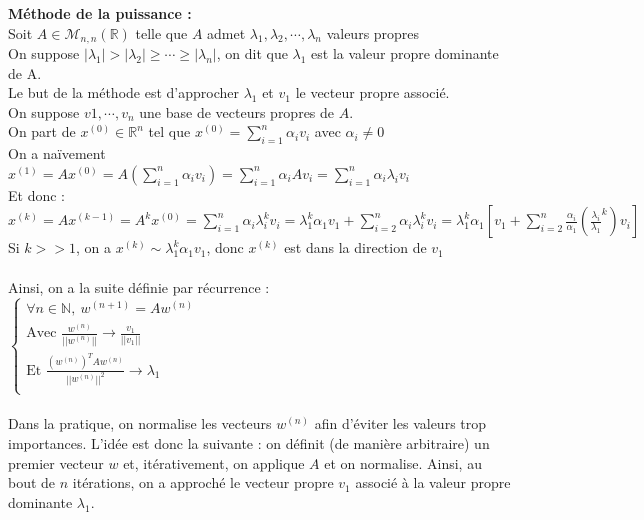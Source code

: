 \documentclass[a4paper,10pt]{report}
\begin{document}
\indent \textbf{Méthode de la puissance :} \\
Soit $A \in \mathcal{M}_{n,n}(\mathbb{R})$ telle que $A$ admet $\lambda_1, \lambda_2, \cdots, \lambda_n$ valeurs propres \\
On suppose $|\lambda_1|> |\lambda_2| \geq \cdots \geq |\lambda_n|$, on dit que $\lambda_1$ est la valeur propre dominante de A.\\
Le but de la méthode est d'approcher $\lambda_1$ et $v_1$ le vecteur propre associé.\\
On suppose {$v1, \cdots, v_n$} une base de vecteurs propres de $A$.\\
On part de $x^{(0)} \in \mathbb{R}^n$ tel que $x^{(0)}=\sum \limits_{i=1}^n \alpha_i v_i$ avec $\alpha_i \neq 0$\\
On a naïvement $x^{(1)} =Ax^{(0)}=A(\sum \limits_{i=1}^n \alpha_i v_i)= \sum \limits_{i=1}^n \alpha_i A v_i =\sum \limits_{i=1}^n \alpha_i \lambda_i v_i$\\
Et donc : $x^{(k)} = Ax^{(k-1)} = A^kx^{(0)} = \sum \limits_{i=1}^n \alpha_i \lambda_i^k v_i = \lambda_1^k \alpha_1 v_1 + \sum \limits_{i=2}^n \alpha_i \lambda_i^k v_i = \lambda_1^k \alpha_1 \left[ v_1 + \sum \limits_{i=2}^n \frac{\alpha_i}{\alpha_1} \left(\frac{\lambda_i}{\lambda_1}^k \right) v_i \right]$ \\
Si $k>>1$, on a $x^{(k)}\sim \lambda_1^k \alpha_1 v_1$, donc $x^{(k)}$ est dans la direction de $v_1$\\ \\
Ainsi, on a la suite définie par récurrence :\\
$\left\lbrace
\begin{array}{l}
\forall n \in \mathbb{N}, \ w^{(n+1)}=Aw^{(n)}  \\
\text{Avec } \frac{w^{(n)}}{||w^{(n)}||} \longrightarrow \frac{v_1}{||v_1||} \\
\text{Et } \frac{(w^{(n)})^TAw^{(n)}}{||w^{(n)}||^2} \longrightarrow \lambda_1 \\
\end{array}\right. $\\ \\
Dans la pratique, on normalise les vecteurs $w^{(n)}$ afin d'éviter les valeurs trop importances. L'idée est donc la suivante : on définit (de manière arbitraire) un premier vecteur $w$ et, itérativement, on applique $A$ et on normalise. Ainsi, au bout de $n$ itérations, on a approché le vecteur propre $v_1$ associé à la valeur propre dominante $\lambda_1$. \\
\end{document}
